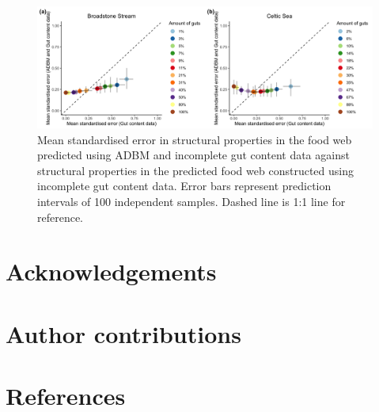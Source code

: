 \documentclass{article}
\begin{document}
\begin{figure}

{\centering \includegraphics[width=500px]{../../results/misc/mse_model_vs_data} 

}

\caption{\label{fig:fig_r32} Mean standardised error in structural properties in the food web predicted using ADBM and incomplete gut content data against structural properties in the predicted food web constructed using incomplete gut content data. Error bars represent prediction intervals of 100 independent samples. Dashed line is 1:1 line for reference.}\label{fig:fig_r32}
\end{figure}

\hypertarget{acknowledgements}{%
\section{Acknowledgements}\label{acknowledgements}}

\hypertarget{author-contributions}{%
\section{Author contributions}\label{author-contributions}}

\hypertarget{references}{%
\section{References}\label{references}}
\end{document}
